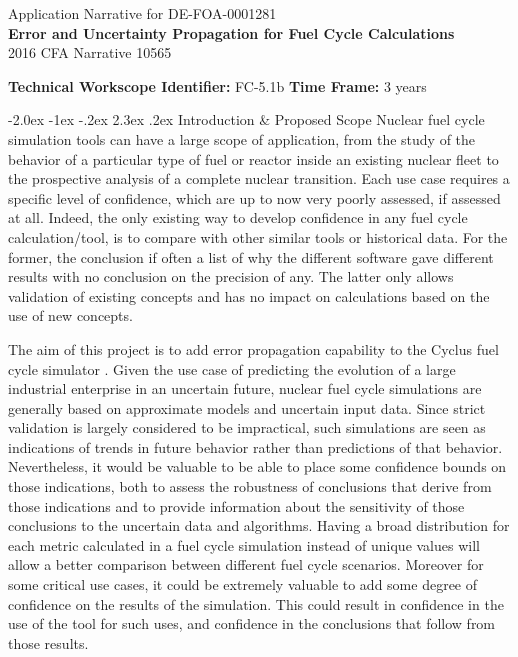 \documentclass[dvips,11pt]{article}
\makeatletter
\renewcommand\section{\@startsection {section}{1}{\z@}%
                                   {-2.0ex \@plus -1ex \@minus -.2ex}%
                                   {2.3ex \@plus.2ex}%
                                   {\normalfont\bfseries}}%
\makeatother
\begin{document}
\begin{centering}
  Application Narrative for DE-FOA-0001281\\
  \textbf{\large Error and Uncertainty Propagation for Fuel Cycle Calculations}\\
  2016 CFA Narrative 10565\\
\end{centering}
\vspace{1em}

\noindent\textbf{Technical Workscope Identifier:} FC-5.1b \hspace{1.5in} \textbf{Time Frame:} 3 years

\section{Introduction \& Proposed Scope}
Nuclear fuel cycle simulation tools can have a large
scope of application, from the study of the
behavior of a particular type of fuel or reactor inside an
existing nuclear fleet to the prospective analysis
of a complete nuclear transition. 
Each use case
requires a specific level
of confidence, which are up to now very
poorly assessed, if assessed at all.
Indeed, the only existing way to develop confidence in
any fuel cycle calculation/tool, is to compare
with other similar tools or historical
data.  For the former, the conclusion if often 
a list of why the different software gave
different results with no conclusion on the
precision of any.  The latter only allows
validation of existing concepts and has no impact
on calculations based on the use of new
concepts.

The aim of this project is to add error
propagation capability to the Cyclus fuel cycle
simulator \cite{Cyclus_paper}. Given the use case of predicting the
evolution of a large industrial enterprise in an
uncertain future, nuclear fuel cycle simulations
are generally based on approximate models and
uncertain input data.  Since strict validation is largely
considered to be impractical, such simulations are
seen as indications of trends in future behavior rather than
predictions of that behavior. Nevertheless, it
would be valuable to be able to place some
confidence bounds on those indications, both to
assess the robustness of conclusions that derive
from those indications and to provide information
about the sensitivity of those conclusions to the
uncertain data and algorithms.  Having a broad
distribution for each metric calculated in a fuel
cycle simulation instead of unique values will
allow a better comparison between different fuel
cycle scenarios.  Moreover for some critical
use cases, it could be extremely valuable to add
some degree of confidence on the results of the simulation.
This could result in confidence in the use of the tool for
such uses, and confidence in the conclusions that follow
from those results.
\end{document}
